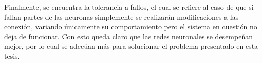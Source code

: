  		Finalmente, se encuentra la tolerancia a fallos, el cual se refiere al caso
 	de que si fallan partes de las neuronas simplemente se realizar\'{a}n
 	modificaciones a las conexi\'{o}n, variando \'{u}nicamente su comportamiento
 	pero el sistema en cuesti\'{o}n no deja de funcionar. Con esto queda claro que
 	las redes neuronales se desempe\~{n}an mejor, por lo cual se adec\'{u}an
 	m\'{a}s para solucionar el problema presentado en esta tesis.
 	

